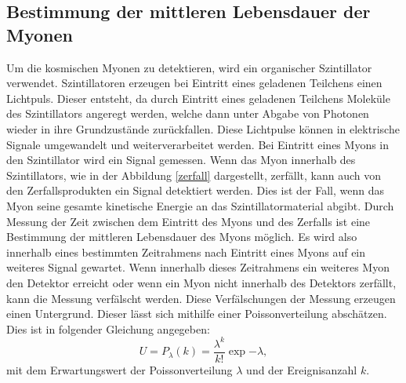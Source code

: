 \subsection{Bestimmung der mittleren Lebensdauer der Myonen}
\label{subsec:BestimmungLebensdauer}
Um die kosmischen Myonen zu detektieren, wird ein organischer Szintillator verwendet.
Szintillatoren erzeugen bei Eintritt eines geladenen Teilchens einen Lichtpuls.
Dieser entsteht, da durch Eintritt eines geladenen Teilchens Moleküle des Szintillators
angeregt werden, welche dann unter Abgabe von Photonen wieder in ihre Grundzustände zurückfallen.
Diese Lichtpulse können in elektrische Signale umgewandelt und weiterverarbeitet werden.
Bei Eintritt eines Myons in den Szintillator wird ein Signal gemessen. Wenn das Myon innerhalb
des Szintillators, wie in der Abbildung \ref{zerfall} dargestellt, zerfällt, kann auch von den Zerfallsprodukten
ein Signal detektiert werden. Dies ist der Fall, wenn das Myon seine gesamte kinetische Energie
an das Szintillatormaterial abgibt.
Durch Messung der Zeit zwischen dem Eintritt des Myons und des
Zerfalls ist eine Bestimmung der mittleren Lebensdauer des Myons möglich. Es wird also
innerhalb eines bestimmten Zeitrahmens nach Eintritt eines Myons auf ein weiteres Signal
gewartet. Wenn innerhalb dieses Zeitrahmens ein weiteres Myon den Detektor erreicht oder wenn
ein Myon nicht innerhalb des Detektors zerfällt, kann die Messung verfälscht werden.
Diese Verfälschungen der Messung erzeugen einen Untergrund. Dieser lässt sich mithilfe
einer Poissonverteilung abschätzen. Dies ist in folgender Gleichung angegeben:
\begin{equation}
  U = P_{\lambda} (k) = \frac{\lambda^{k}}{k!} \exp{-\lambda},
  \label{eqn:Untergrundrate}
\end{equation}
\noindent
mit dem Erwartungswert der Poissonverteilung $\lambda$ und der Ereignisanzahl $k$.
